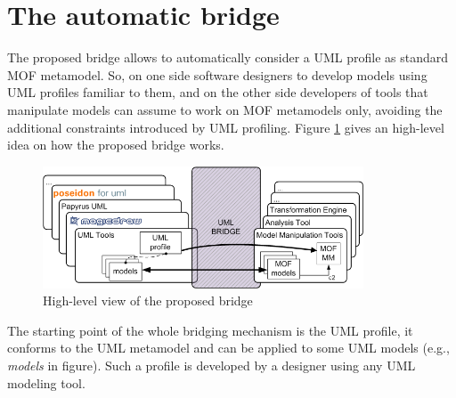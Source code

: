 \section{The automatic bridge}\label{sec:framework}
%
The proposed bridge allows to automatically consider a UML profile as standard MOF metamodel.
So, on one side software designers to develop models using UML profiles familiar to them, and on the other side 
developers of tools that manipulate models can assume to work on MOF metamodels only, avoiding the additional
constraints introduced by UML profiling.
Figure \ref{fig:overall} gives an high-level idea on how the proposed bridge works. 

\begin{figure}[htbp]
	\centering
		\includegraphics[width=0.85\textwidth]{figures/overview.png}
	\caption{High-level view of the proposed bridge}
	\label{fig:overall}
\end{figure}

The starting point of the whole bridging mechanism is the UML profile, 
it conforms to the UML metamodel and can be applied to some UML models (e.g., \textit{models} in figure).
Such a profile is developed by a designer using any UML modeling tool.

